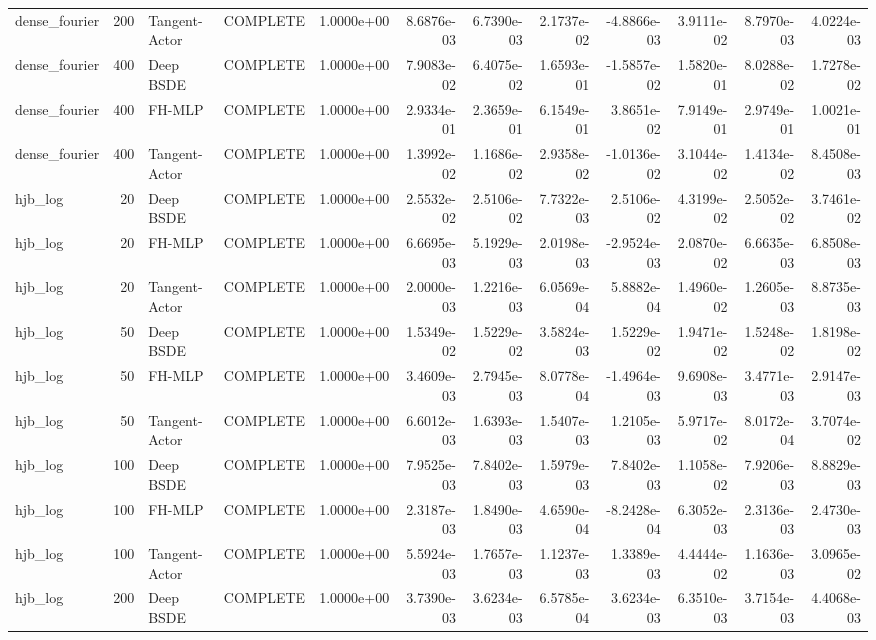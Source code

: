 \begin{tabular}{lrllrrrrrrrr}
dense\_fourier & 200 & Tangent-Actor & COMPLETE & 1.0000e+00 & 8.6876e-03 & 6.7390e-03 & 2.1737e-02 & -4.8866e-03 & 3.9111e-02 & 8.7970e-03 & 4.0224e-03 \\
dense\_fourier & 400 & Deep BSDE & COMPLETE & 1.0000e+00 & 7.9083e-02 & 6.4075e-02 & 1.6593e-01 & -1.5857e-02 & 1.5820e-01 & 8.0288e-02 & 1.7278e-02 \\
dense\_fourier & 400 & FH-MLP & COMPLETE & 1.0000e+00 & 2.9334e-01 & 2.3659e-01 & 6.1549e-01 & 3.8651e-02 & 7.9149e-01 & 2.9749e-01 & 1.0021e-01 \\
dense\_fourier & 400 & Tangent-Actor & COMPLETE & 1.0000e+00 & 1.3992e-02 & 1.1686e-02 & 2.9358e-02 & -1.0136e-02 & 3.1044e-02 & 1.4134e-02 & 8.4508e-03 \\
hjb\_log & 20 & Deep BSDE & COMPLETE & 1.0000e+00 & 2.5532e-02 & 2.5106e-02 & 7.7322e-03 & 2.5106e-02 & 4.3199e-02 & 2.5052e-02 & 3.7461e-02 \\
hjb\_log & 20 & FH-MLP & COMPLETE & 1.0000e+00 & 6.6695e-03 & 5.1929e-03 & 2.0198e-03 & -2.9524e-03 & 2.0870e-02 & 6.6635e-03 & 6.8508e-03 \\
hjb\_log & 20 & Tangent-Actor & COMPLETE & 1.0000e+00 & 2.0000e-03 & 1.2216e-03 & 6.0569e-04 & 5.8882e-04 & 1.4960e-02 & 1.2605e-03 & 8.8735e-03 \\
hjb\_log & 50 & Deep BSDE & COMPLETE & 1.0000e+00 & 1.5349e-02 & 1.5229e-02 & 3.5824e-03 & 1.5229e-02 & 1.9471e-02 & 1.5248e-02 & 1.8198e-02 \\
hjb\_log & 50 & FH-MLP & COMPLETE & 1.0000e+00 & 3.4609e-03 & 2.7945e-03 & 8.0778e-04 & -1.4964e-03 & 9.6908e-03 & 3.4771e-03 & 2.9147e-03 \\
hjb\_log & 50 & Tangent-Actor & COMPLETE & 1.0000e+00 & 6.6012e-03 & 1.6393e-03 & 1.5407e-03 & 1.2105e-03 & 5.9717e-02 & 8.0172e-04 & 3.7074e-02 \\
hjb\_log & 100 & Deep BSDE & COMPLETE & 1.0000e+00 & 7.9525e-03 & 7.8402e-03 & 1.5979e-03 & 7.8402e-03 & 1.1058e-02 & 7.9206e-03 & 8.8829e-03 \\
hjb\_log & 100 & FH-MLP & COMPLETE & 1.0000e+00 & 2.3187e-03 & 1.8490e-03 & 4.6590e-04 & -8.2428e-04 & 6.3052e-03 & 2.3136e-03 & 2.4730e-03 \\
hjb\_log & 100 & Tangent-Actor & COMPLETE & 1.0000e+00 & 5.5924e-03 & 1.7657e-03 & 1.1237e-03 & 1.3389e-03 & 4.4444e-02 & 1.1636e-03 & 3.0965e-02 \\
hjb\_log & 200 & Deep BSDE & COMPLETE & 1.0000e+00 & 3.7390e-03 & 3.6234e-03 & 6.5785e-04 & 3.6234e-03 & 6.3510e-03 & 3.7154e-03 & 4.4068e-03 \\

\end{tabular}
